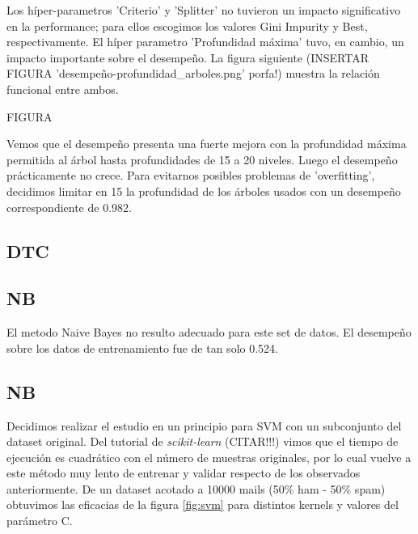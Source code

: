 \documentclass[a4paper,10pt]{article}
\begin{document}
Los híper-parametros 'Criterio' y 'Splitter' no tuvieron un impacto 
significativo en la performance; para ellos escogimos los valores Gini Impurity 
y Best, respectivamente.
El híper parametro 'Profundidad máxima' tuvo, en cambio, un impacto 
importante sobre el desempeño. La figura siguiente (INSERTAR FIGURA 
'desempeño-profundidad_arboles.png' porfa!) muestra 
la relación funcional entre ambos.

FIGURA

Vemos que el desempeño presenta una fuerte mejora con la profundidad máxima 
permitida al árbol hasta profundidades de 15 a 20 niveles. Luego el desempeño 
prácticamente no crece. Para evitarnos posibles problemas de 'overfitting', 
decidimos limitar en 15 la profundidad de los árboles usados con un desempeño 
correspondiente de 0.982.

\subsection{DTC}


\subsection{NB}

El metodo Naive Bayes no resulto adecuado para este set de datos. El desempeño 
sobre los datos de entrenamiento fue de tan solo 0.524.

\subsection{NB}


\par Decidimos realizar el estudio en un principio para SVM con un subconjunto del dataset original. Del tutorial de \emph{scikit-learn} (CITAR!!!) vimos que el tiempo de ejecución es cuadrático con el número de muestras originales, por lo cual vuelve a este método muy lento de entrenar y validar respecto de los observados anteriormente. De un dataset acotado a 10000 mails (50\% ham - 50\% spam) obtuvimos las eficacias de la figura \ref{fig:svm} para distintos kernels y valores del parámetro C.
\end{document}
